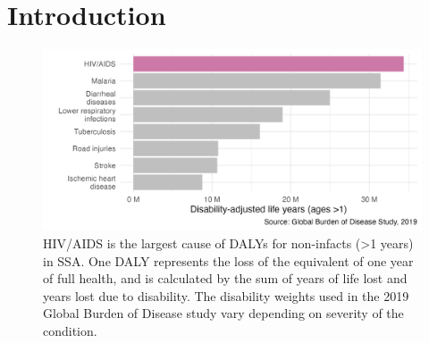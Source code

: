 \documentclass[a4paper, nobind]{templates/ociamthesis}
\begin{document}
\begin{romanpages}
\flushbottom

\tableofcontents

\listoffigures
	\mtcaddchapter

\listoftables
  \mtcaddchapter




\end{romanpages}

\flushbottom

\hypertarget{introduction}{%
\chapter{Introduction}\label{introduction}}

\adjustmtc
{}

\begin{figure}

{\centering \includegraphics[width=0.95\linewidth]{figures/introduction/gbd} 

}

\caption{HIV/AIDS is the largest cause of DALYs for non-infacts (>1 years) in SSA. One DALY represents the loss of the equivalent of one year of full health, and is calculated by the sum of years of life lost and years lost due to disability. The disability weights used in the 2019 Global Burden of Disease study vary depending on severity of the condition. }\label{fig:gbd}
\end{figure}
\end{document}
